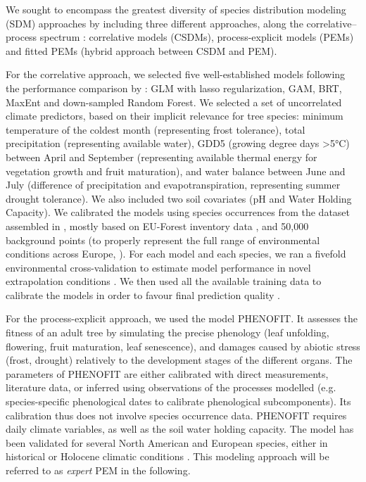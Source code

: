 \documentclass[letterpaper,8pt]{article}  %
\begin{document}
\begin{doublespacing}
\begin{linenumbers}
We sought to encompass the greatest diversity of species distribution modeling (SDM) approaches by including three different approaches, along the correlative–process spectrum \citep{Dormann2012}: correlative models (CSDMs), process-explicit models (PEMs) and fitted PEMs (hybrid approach between CSDM and PEM).

For the correlative approach, we selected five well-established models following the performance comparison by \cite{Valavi2022}: GLM with lasso regularization, GAM, BRT, MaxEnt and down-sampled Random Forest. We selected a set of uncorrelated climate predictors, based on their implicit relevance for tree species: minimum temperature of the coldest month (representing frost tolerance), total precipitation (representing available water), GDD5 (growing degree days \textgreater5°C) between April and September (representing available thermal energy for vegetation growth and fruit maturation), and water balance between June and July (difference of precipitation and evapotranspiration, representing summer drought tolerance). We also included two soil covariates (pH and Water Holding Capacity). We calibrated the models using species occurrences from the dataset assembled in \cite{VanderMeersch2023}, mostly based on EU-Forest inventory data \citep{Mauri2017}, and 50,000 background points (to properly represent the full range of environmental conditions across Europe, \citealp{Valavi2022}). For each model and each species, we ran a fivefold environmental cross-validation to estimate model performance in novel extrapolation conditions \citep{Roberts2017}. We then used all the available training data to calibrate the models in order to favour final prediction quality \citep{Roberts2017}.

For the process-explicit approach, we used the model PHENOFIT. It assesses the fitness of an adult tree by simulating the precise phenology (leaf unfolding, flowering, fruit maturation, leaf senescence), and damages caused by abiotic stress (frost, drought) relatively to the development stages of the different organs. The parameters of PHENOFIT are either calibrated with direct measurements, literature data, or inferred  using observations of the processes modelled (e.g. species-specific phenological dates to calibrate phenological subcomponents). Its calibration thus does not involve species occurrence data. PHENOFIT requires daily climate variables, as well as the soil water holding capacity. The model has been validated for several North American and European species, either in historical or Holocene climatic conditions \citep{Morin2007, Saltre2013, Duputie2015, Gauzere2020, VanderMeersch2024}. This modeling approach will be referred to as \emph{expert} PEM in the following.


\end{linenumbers}
\end{doublespacing}
\end{document}
